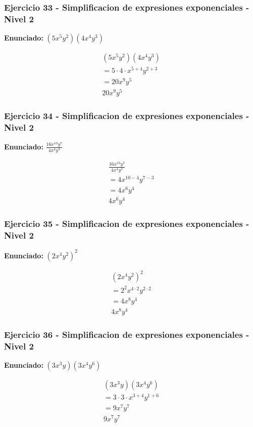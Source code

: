 \documentclass[12pt,a4paper]{article}
\begin{document}
\subsubsection*{Ejercicio 33 - Simplificacion de expresiones exponenciales - Nivel 2}
\textbf{Enunciado:} \((5x^{5}y^{2})(4x^{4}y^{3})\)

\[
\begin{aligned}
(5x^{5}y^{2})(4x^{4}y^{3})\\
=5\cdot 4\cdot x^{5+4}y^{2+3}\\
=20x^{9}y^{5}\\
\boxed{20x^{9}y^{5}}
\end{aligned}
\]


\subsubsection*{Ejercicio 34 - Simplificacion de expresiones exponenciales - Nivel 2}
\textbf{Enunciado:} \(\frac{16x^{10}y^{7}}{4x^{4}y^{3}}\)

\[
\begin{aligned}
\frac{16x^{10}y^{7}}{4x^{4}y^{3}}\\
=4x^{10-4}y^{7-3}\\
=4x^{6}y^{4}\\
\boxed{4x^{6}y^{4}}
\end{aligned}
\]


\subsubsection*{Ejercicio 35 - Simplificacion de expresiones exponenciales - Nivel 2}
\textbf{Enunciado:} \(\left(2x^{4}y^{2}\right)^{2}\)

\[
\begin{aligned}
\left(2x^{4}y^{2}\right)^{2}\\
=2^{2}x^{4\cdot 2}y^{2\cdot 2}\\
=4x^{8}y^{4}\\
\boxed{4x^{8}y^{4}}
\end{aligned}
\]


\subsubsection*{Ejercicio 36 - Simplificacion de expresiones exponenciales - Nivel 2}
\textbf{Enunciado:} \((3x^{3}y)(3x^{4}y^{6})\)

\[
\begin{aligned}
(3x^{3}y)(3x^{4}y^{6})\\
=3\cdot 3\cdot x^{3+4}y^{1+6}\\
=9x^{7}y^{7}\\
\boxed{9x^{7}y^{7}}
\end{aligned}
\]
\end{document}
